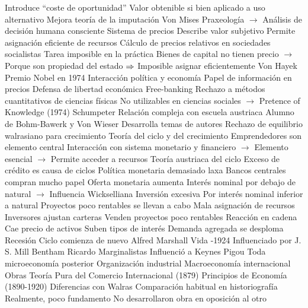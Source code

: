 \documentclass{nuevotema}
\begin{document}
\begin{esquemal}
				\4 Introduce ``coste de oportunidad''
				\4[] Valor obtenible si bien aplicado a uso alternativo
				\4[] Mejora teoría de la imputación
			\3 Von Mises
				\4 Praxeología
				\4[] $\to$ Análisis de decisión humana consciente
				\4 Sistema de precios
				\4[] Describe valor subjetivo
				\4[] Permite asignación eficiente de recursos
				\4 Cálculo de precios relativos en sociedades socialistas
				\4[] Tarea imposible en la práctica
				\4[] Bienes de capital no tienen precio
				\4[] $\to$ Porque son propiedad del estado
				\4[] $\then$ Imposible asignar eficientemente
			\3 Von Hayek
				\4 Premio Nobel en 1974
				\4 Interacción política y economía
				\4 Papel de información en precios
				\4 Defensa de libertad económica
				\4 Free-banking
				\4 Rechazo a métodos cuantitativos de ciencias físicas
				\4[] No utilizables en ciencias sociales
				\4[] $\to$ Pretence of Knowledge (1974)
			\3 Schumpeter
				\4 Relación compleja con escuela austriaca
				\4[] Alumno de Bohm-Bawerk y Von Wieser
				\4[] Desarrolla temas de autores
				\4 Rechazo de equilibrio walrasiano para crecimiento
				\4 Teoría del ciclo y del crecimiento
				\4[] Emprendedores son elemento central
				\4[] Interacción con sistema monetario y financiero
				\4[] $\to$ Elemento esencial
				\4[] $\to$ Permite acceder a recursos
			\3 Teoría austriaca del ciclo
				\4 Exceso de crédito es causa de ciclos
				\4 Política monetaria demasiado laxa
				\4[] Bancos centrales compran mucho papel
				\4[] Oferta monetaria aumenta
				\4[] Interés nominal por debajo de natural
				\4[] $\to$ Influencia Wickselliana
				\4 Inversión excesiva
				\4[] Por interés nominal inferior a natural
				\4[] Proyectos poco rentables se llevan a cabo
				\4[] Mala asignación de recursos
				\4 Inversores ajustan carteras
				\4[] Venden proyectos poco rentables
				\4[] Reacción en cadena
				\4[] Cae precio de activos
				\4[] Suben tipos de interés
				\4[] Demanda agregada se desploma
				\4[$\then$] Recesión
				\4 Ciclo comienza de nuevo
	\1 
		\2 Alfred Marshall
			\3 Vida
				-1924
			\3 Influenciado por
				\4 J. S. Mill
				\4 Bentham
				\4 Ricardo
				\4 Marginalistas
			\3 Influenció a
				\4 Keynes
				\4 Pigou
				\4 Toda microeconomía posterior
				\4 Organización industrial
				\4 Macroeconomía internacional
			\3 Obras
				\4 Teoría Pura del Comercio Internacional (1879)
				\4 Principios de Economía (1890-1920)
			\3 Diferencias con Walras
				\4 Comparación habitual en historiografía
				\4[] Realmente, poco fundamento
				\4[] No desarrollaron obra en oposición al otro

\end{esquemal}
\end{document}
